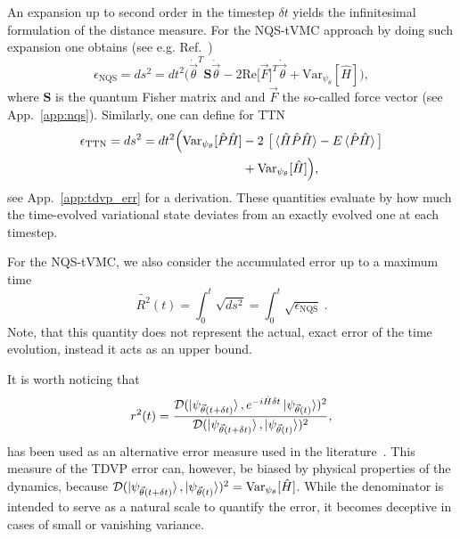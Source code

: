 \documentclass[aps,pra,reprint,amssymb,superscriptaddress]{revtex4-2}
\begin{document}
An expansion up to second order in the timestep $\delta t$ yields the infinitesimal formulation of the distance measure.
For the NQS-tVMC approach by doing such expansion one obtains (see e.g. Ref.~\cite{schmitt_simulating_2025}) 
\begin{equation}
\epsilon_{\text{NQS}} = ds^2 = dt^2\Big(\dot{\vec\theta}^T\mathbf{S}\dot{\vec\theta}-2\text{Re}\big[\vec F\big]^T\dot{\vec\theta}+\text{Var}_{\psi_\theta}[\hat H]\Big) \label{eq:tdvp_error_tvmc},
\end{equation}
where $\mathbf{S}$ is the quantum Fisher matrix and and $\vec{F}$ the so-called force vector (see App.~\ref{app:nqs}). Similarly, one can define for  TTN
\begin{align}
\epsilon_{\text{TTN}} = ds^2 = dt^2\Big(\text{Var}_{\psi_\theta}[\hat P \hat H] &- 2\ \big[\braket{\hat H \hat P \hat H} - E \braket{\hat P \hat H}\big] \nonumber \\  
&+ \text{Var}_{\psi_\theta}[\hat H]\Big) \label{eq:tdvp_error_ttn},
\end{align}
see App.~\ref{app:tdvp_err} for a derivation.
These quantities evaluate by how much the time-evolved variational state deviates from an exactly evolved one at each timestep.

For the NQS-tVMC, we also consider the accumulated error up to a maximum time
\begin{equation}
\tilde{R^2}(t)=\int_0^t\sqrt{ds^2}=\int_0^t\sqrt{\epsilon_{\text{NQS}}}\ .
\label{eq:projerror_tdvp}
\end{equation}
Note, that this quantity does not represent the actual, exact error of the time evolution, instead it acts as an upper bound.

It is worth noticing that
\begin{equation}
r^2(t) = \frac{{\cal{D}}(\ket{\psi_{\vec{\theta}(t + \delta t)}}, 
e^{-i\hat H \delta t}\ket{\psi_{\vec{\theta}(t)}})^2}
{{\cal{D}}(\ket{\psi_{\vec{\theta}(t + \delta t)}},\ket{\psi_{\vec{\theta}(t)}})^2},
\label{eq:old_tdvp_err}
\end{equation}
has been used as an alternative error measure used in the literature~\cite{carleo_solving_2017, schmitt_quantum_2020}. This measure of the TDVP error can, however, be biased by physical properties of the dynamics, because ${\cal{D}}(\ket{\psi_{\vec{\theta}(t + \delta t)}},\ket{\psi_{\vec{\theta}(t)}})^2=\text{Var}_{\psi_\theta}[\hat H]$. While the denominator is intended to serve as a natural scale to quantify the error, it becomes deceptive in cases of small or vanishing variance.
\end{document}
